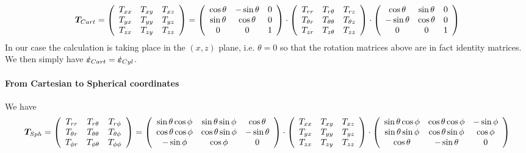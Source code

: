 \[
{\bm T}_{\tiny Cart}=
\left(
\begin{array}{ccc}
T_{xx} & T_{xy} & T_{xz} \\
T_{yx} & T_{yy} & T_{yz} \\
T_{zx} & T_{zy} & T_{zz} 
\end{array}
\right)
=
\left(
\begin{array}{ccc}
 \cos \theta&-\sin \theta&0 \\
\sin \theta&\cos \theta&0 \\
0 & 0 & 1 
\end{array}
\right)
\cdot
\left(
\begin{array}{ccc}
T_{rr}       & T_{r\theta}      & T_{rz} \\
T_{\theta r} & T_{\theta\theta} & T_{\theta z} \\
T_{z r}      & T_{z \theta}     & T_{zz}
\end{array}
\right)
\cdot
\left(
\begin{array}{ccc}
\cos \theta & \sin \theta&0 \\
-\sin \theta &  \cos \theta&0 \\
0 & 0 & 1 
\end{array}
\right)
\]
In our case the calculation is taking place in the $(x,z)$
plane, i.e. $\theta=0$ so that the rotation matrices above 
are in fact identity matrices. 
We then simply have 
$\dot{\bm \varepsilon}_{\tiny Cart}=
\dot{\bm \varepsilon}_{\tiny Cyl}$.



\paragraph{From Cartesian to Spherical coordinates}

We have
\[
{\bm T}_{\tiny Sph}=
\left(
\begin{array}{ccc}
T_{rr}       & T_{r\theta}      & T_{r\phi} \\
T_{\theta r} & T_{\theta\theta} & T_{\theta\phi} \\
T_{\phi r}   & T_{\phi \theta}  & T_{\phi\phi}
\end{array}
\right)
=
\left(
\begin{array}{ccc}
\sin\theta \cos\phi & \sin\theta \sin\phi & \cos\theta \\
\cos\theta \cos\phi & \cos\theta \sin\phi & -\sin\theta \\
-\sin\phi & \cos\phi & 0 
\end{array}
\right)
\cdot
\left(
\begin{array}{ccc}
T_{xx} & T_{xy} & T_{xz} \\
T_{yx} & T_{yy} & T_{yz} \\
T_{zx} & T_{zy} & T_{zz} 
\end{array}
\right)
\cdot
\left(
\begin{array}{ccc}
\sin\theta\cos\phi & \cos\theta\cos\phi & -\sin\phi \\
\sin\theta\sin\phi & \cos\theta\sin\phi & \cos\phi \\
\cos\theta & -\sin\theta & 0
\end{array}
\right)
\]

